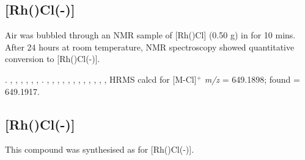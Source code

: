 
\subsection*{\texorpdfstring{[Rh(\tBusixantphos)Cl(-)]} R}


Air was bubbled through an NMR sample of [Rh(\tBusixantphos)Cl] (0.50 g) in  for 10 mins.  After 24 hours at room temperature, NMR spectroscopy showed quantitative conversion to [Rh(\tBusixantphos)Cl(-)].

.
,
,
,
,
,
,
.
,
,
,
,
,
,
,
,
,
,
,
,
HRMS calcd for  [M-Cl]$^+$ \emph{m/z} = 649.1898; found = 649.1917.


\subsection*{\texorpdfstring{[Rh(\tButhixantphos)Cl(-)]} R}


This compound was synthesised as for [Rh(\tBusixantphos)Cl(-)].

